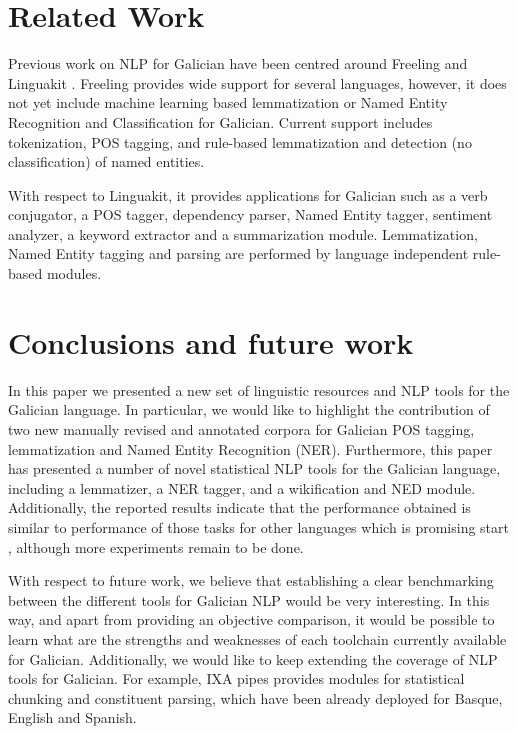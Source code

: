 \documentclass[10pt, a4paper]{article}
\begin{document}
\section{Related Work}\label{sec:related-work}

Previous work on NLP for Galician have been centred around Freeling \cite{freeling3_padro12} and Linguakit \cite{gamallo2017linguakit}. Freeling provides wide support for several languages, however, it does not yet include machine learning based lemmatization or Named Entity Recognition and Classification for Galician. Current support includes tokenization, POS tagging, and rule-based lemmatization and detection (no classification) of named entities.

With respect to Linguakit, it provides applications for Galician such as a verb conjugator, a POS tagger, dependency parser, Named Entity tagger, sentiment analyzer, a keyword extractor and a summarization module. Lemmatization, Named Entity tagging and parsing are performed by language independent rule-based modules.

\section{Conclusions and future work}

In this paper we presented a new set of linguistic resources and NLP tools for the Galician language. In particular, we would like to highlight the contribution of two new manually revised and annotated corpora for Galician POS tagging, lemmatization and Named Entity Recognition (NER). Furthermore, this paper has presented a number of novel statistical NLP tools for the Galician language, including a lemmatizer, a NER tagger, and a wikification and NED module. Additionally, the reported results indicate that the performance obtained is similar to performance of those tasks for other languages which is promising start \cite{agerri2016robust}, although more experiments remain to be done.

With respect to future work, we believe that establishing a clear benchmarking between the different tools for Galician NLP would be very interesting. In this way, and apart from providing an objective comparison, it would be possible to learn what are the strengths and weaknesses of each toolchain currently available for Galician. Additionally, we would like to keep extending the coverage of NLP tools for Galician. For example, IXA pipes provides modules for statistical chunking and constituent parsing, which have been already deployed for Basque, English and Spanish.
\end{document}
